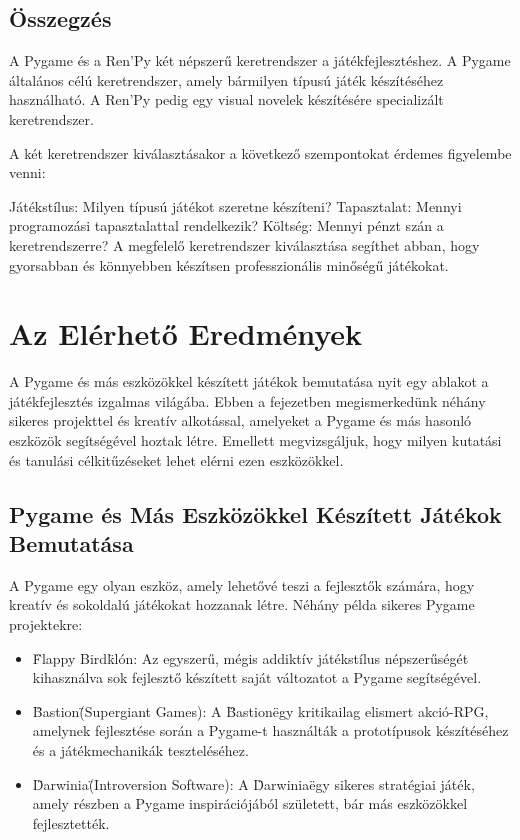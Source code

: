 \subsection{Összegzés}

A Pygame és a Ren'Py két népszerű keretrendszer a játékfejlesztéshez. A Pygame általános célú keretrendszer, amely bármilyen típusú játék készítéséhez használható. A Ren'Py pedig egy visual novelek készítésére specializált keretrendszer.

A két keretrendszer kiválasztásakor a következő szempontokat érdemes figyelembe venni:

Játékstílus: Milyen típusú játékot szeretne készíteni?
Tapasztalat: Mennyi programozási tapasztalattal rendelkezik?
Költség: Mennyi pénzt szán a keretrendszerre?
A megfelelő keretrendszer kiválasztása segíthet abban, hogy gyorsabban és könnyebben készítsen professzionális minőségű játékokat.

\section{Az Elérhető Eredmények}

A Pygame és más eszközökkel készített játékok bemutatása nyit egy ablakot a játékfejlesztés izgalmas világába. Ebben a fejezetben megismerkedünk néhány sikeres projekttel és kreatív alkotással, amelyeket a Pygame és más hasonló eszközök segítségével hoztak létre. Emellett megvizsgáljuk, hogy milyen kutatási és tanulási célkitűzéseket lehet elérni ezen eszközökkel.

\subsection{Pygame és Más Eszközökkel Készített Játékok Bemutatása}
A Pygame egy olyan eszköz, amely lehetővé teszi a fejlesztők számára, hogy kreatív és sokoldalú játékokat hozzanak létre. Néhány példa sikeres Pygame projektekre:

\begin{itemize}
    
    
    \item\"Flappy Bird\" klón: Az egyszerű, mégis addiktív játékstílus népszerűségét kihasználva sok fejlesztő készített saját változatot a Pygame segítségével.
    
    \item\"Bastion\" (Supergiant Games): A \"Bastion\" egy kritikailag elismert akció-RPG, amelynek fejlesztése során a Pygame-t használták a prototípusok készítéséhez és a játékmechanikák teszteléséhez.
    
    \item\"Darwinia\" (Introversion Software): A \"Darwinia\" egy sikeres stratégiai játék, amely részben a Pygame inspirációjából született, bár más eszközökkel fejlesztették.
\end{itemize}

